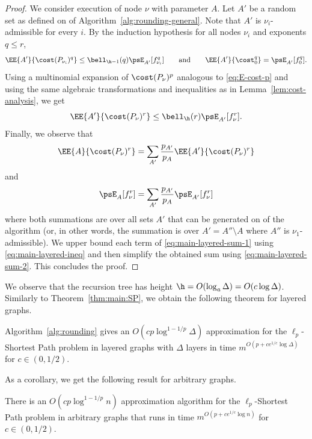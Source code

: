 \documentclass[11pt,a4paper]{article}
\begin{document}
\begin{proof}
We consider execution of node $\nu$ with parameter $A$. Let $A'$ be a random set as defined on  of Algorithm~\ref{alg:rounding-general}. Note that $A'$ is $\nu_i$-admissible for every $i$.
By the induction hypothesis for all nodes $\nu_i$ and exponents $q\leq r$,
$$
\EE{A'}{\cost(P_{\nu_i})^{q}} \leq \bell_{\h-1}(q) \psE_{A'}[f_{\nu_i}^{q}]
\qquad
\text{and}
\qquad
\EE{A'}{\cost_0^{q}} = \psE_{A'}[f_0^{q}].
$$
Using a multinomial expansion of $\cost(P_\nu)^p$ analogous to \eqref{eq:E-cost-p} and using the same algebraic transformations and inequalities as in Lemma~\ref{lem:cost-analysis}, we get
\begin{equation}\label{eq:main-layered-ineq}
\EE{A'}{\cost(P_\nu)^{r}} \leq \bell_{\h}(r) \psE_{A'}[f_\nu^{r}].
\end{equation}
Finally, we observe that
\begin{equation}\label{eq:main-layered-sum-1}\EE{A}{\cost(P_\nu)^{r}} = \sum_{A'} \frac{p_{A'}}{p_A}\EE{A'}{\cost(P_\nu)^{r}}
\end{equation}
and 
\begin{equation}\label{eq:main-layered-sum-2}
\psE_{A}[f_\nu^{r}] = \sum_{A'} \frac{p_{A'}}{p_A}\psE_{A'}[f_\nu^{r}]
\end{equation}
where both summations are over all sets $A'$ that can be generated on  of the algorithm (or, in other words, the summation is over $A' = A'' \setminus A$ where  $A''$ is $\nu_1$-admissible). We upper bound each term of \eqref{eq:main-layered-sum-1} using \eqref{eq:main-layered-ineq} and then simplify the obtained sum using \eqref{eq:main-layered-sum-2}. This concludes the proof.
\end{proof}

We observe that the recursion tree has height $\h = O(\log_a \Delta) = O(c\log{\Delta})$.
Similarly to Theorem~\ref{thm:main:SP}, we obtain the following theorem for layered graphs.
\begin{theorem}\label{thm:main:layered}
Algorithm~\ref{alg:rounding} gives an $O(cp \log^{1-1/p} \Delta )$ approximation for the $\ell_p$-Shortest Path problem in layered graphs with $\Delta$ layers in time $m^{O(p + c e^{1/c} \log \Delta)}$ for $c\in(0,1/2)$.
\end{theorem}
As a corollary, we get the following result for arbitrary graphs.
\begin{theorem}\label{thm:main:general}
There is an $O(cp \log^{1-1/p} n)$ approximation algorithm for the $\ell_p$-Shortest Path problem in arbitrary graphs that runs in time $m^{O(p + c e^{1/c} \log n)}$ for $c\in(0,1/2)$.
\end{theorem}
\end{document}
